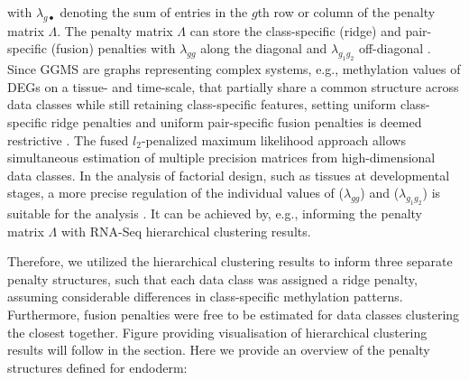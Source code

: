 \documentclass[
	a4paper, %
	10pt, %
	unnumberedsections, %
	twoside, %
]{LTJournalArticle}
\begin{document}
\noindent with $\lambda_{g \bullet}$ denoting the sum of entries in the $g$th row or 
column of the penalty matrix $\Lambda$. The penalty matrix $\Lambda$ can store the 
class-specific (ridge) 
and pair-specific (fusion) penalties with $\lambda_{gg}$ along the diagonal 
and $\lambda_{g_1 g_2}$ off-diagonal \autocite{peeters2022a}. Since GGMS are graphs 
representing complex systems, e.g., methylation values of DEGs on a tissue- 
and time-scale, that partially share a common structure across data classes 
while still retaining 
class-specific features, setting uniform class-specific ridge penalties and 
uniform pair-specific fusion penalties is deemed restrictive 
\autocite{bilgrau2020a, tsai2022a}. 
The fused $l_2$-penalized maximum likelihood approach allows 
simultaneous estimation of multiple precision matrices 
from high-dimensional data classes. In the analysis of factorial 
design, such as tissues at developmental stages, 
a more precise regulation of the individual values of ($\lambda_{gg}$) and ($\lambda_{g_1 g_2}$)
is suitable for the analysis \autocite{bilgrau2020a}. 
It can be achieved by, e.g., informing the penalty matrix $\Lambda$ 
with RNA-Seq hierarchical clustering results.\newline

Therefore, we utilized the hierarchical clustering results to inform three separate 
penalty structures, 
such that each data class was assigned a ridge penalty, assuming considerable
differences in 
class-specific methylation patterns. Furthermore, fusion penalties were 
free to be estimated 
for data classes clustering the closest together. Figure providing visualisation of 
hierarchical clustering results will follow in the 
section. Here we 
provide an overview of 
the penalty structures defined for endoderm:
\end{document}
